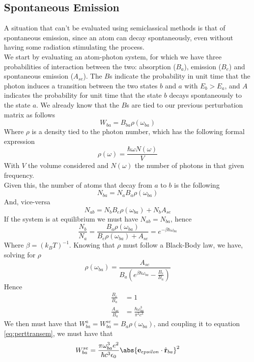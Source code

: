 \documentclass[a4paper, 11pt]{book}
\renewcommand{\vec}[1]{\mathbf{#1}}
\newcommand{\ver}[1]{\vec{e}_{#1}}
\newcommand{\1}{\opr{\mathds{1}}}
\newcommand{\opr}[1]{\hat{#1}}
\newcommand{\vecopr}[1]{\opr{\vec{#1}}}
\theoremstyle{plain}
\begin{document}
	\subsection{Spontaneous Emission}
	A situation that can't be evaluated using semiclassical methods is that of spontaneous emission, since an atom can decay spontaneously, even without having some radiation stimulating the process.\\
	We start by evaluating an atom-photon system, for which we have three probabilities of interaction between the two: absorption ($B_a$), emission ($B_e$) and spontaneous emission ($A_{se}$). The $B$s indicate the probability in unit time that the photon induces a transition between the two states $b$ and $a$ with $E_b>E_a$, and $A$ indicates the probability for unit time that the state $b$ decays spontaneously to the state $a$. We already know that the $B$s are tied to our previous perturbation matrix as follows
	\begin{equation*}
		W_{ba}=B_{ba}\rho(\omega_{ba})
	\end{equation*}
	Where $\rho$ is a density tied to the photon number, which has the following formal expression
	\begin{equation*}
		\rho(\omega)=\frac{\hbar\omega N(\omega)}{V}
	\end{equation*}
	With $V$ the volume considered and $N(\omega)$ the number of photons in that given frequency.\\
	Given this, the number of atoms that decay from $a$ to $b$ is the following
	\begin{equation*}
		N_{ba}=N_aB_a\rho(\omega_{ba})
	\end{equation*}
	And, vice-versa
	\begin{equation*}
		N_{ab}=N_bB_e\rho(\omega_{ba})+N_bA_{se}
	\end{equation*}
	If the system is at equilibrium we must have $N_{ab}=N_{ba}$, hence
	\begin{equation}
		\frac{N_b}{N_a}=\frac{B_a\rho(\omega_{ba})}{B_e\rho(\omega_{ba})+A_{se}}=e^{-\beta\hbar\omega_{ba}}
		\label{eq:equilibriumse}
	\end{equation}
	Where $\beta=(k_BT)^{-1}$. Knowing that $\rho$ must follow a Black-Body law, we have, solving for $\rho$
	\begin{equation}
		\rho(\omega_{ba})=\frac{A_{se}}{B_a\left( e^{\beta\hbar\omega_{ba}}-\frac{B_e}{B_a} \right)}
		\label{eq:transitiondensityse}
	\end{equation}
	Hence
	\begin{equation}
		\begin{aligned}
			\frac{B_e}{B_a}&=1\\
			\frac{A_{se}}{B_a}&=\frac{\hbar\omega_{ba}^3}{\pi^2c^3}
		\end{aligned}
		\label{eq:coefficients}
	\end{equation}
	We then must have that $W_{ba}^a=W_{ba}^{se}=B_a\rho(\omega_{ba})$, and coupling it to equation \eqref{eq:perttransem}, we must have that
	\begin{equation}
		W_{ba}^{se}=\frac{\pi\omega_{ba}^3e^2}{\hbar c^3\epsilon_0}\abs{\ver{epsilon}\cdot\vecopr{r}_{ba}}^2
		\label{eq:spontaneousemissiontransmatrix}
	\end{equation}
\end{document}
